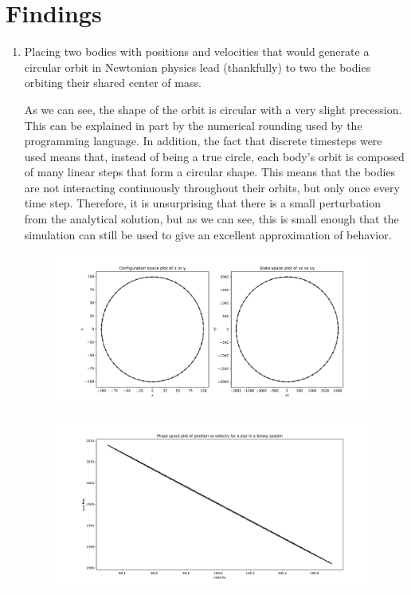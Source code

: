 \documentclass[cm, 10pt]{article}
\begin{document}

\section{Findings}
\begin{enumerate}
  \item Placing two bodies with positions and velocities that would
    generate a circular orbit in Newtonian physics lead (thankfully)
    to two the bodies orbiting their shared center of mass.

    As we can see, the shape of the orbit is circular with a very
    slight precession. This can be explained in part by the numerical
    rounding used by the programming language. In addition, the fact
    that discrete timesteps were used means that, instead of being a
    true circle, each body's orbit is composed of many linear steps
    that form a circular shape. This means that the bodies are not
    interacting continuously throughout their orbits, but only once
    every time step. Therefore, it is unsurprising that there is a
    small perturbation from the analytical solution, but as we can
    see, this is small enough that the simulation can still be used to
    give an excellent approximation of behavior.
    \begin{figure}[H]
      \includegraphics[width=\linewidth]{binary_config.pdf}
    \end{figure}
    \begin{figure}[H]
      \includegraphics[width=\linewidth]{binary_phase.pdf}
    \end{figure}


\end{enumerate}
\end{document}
